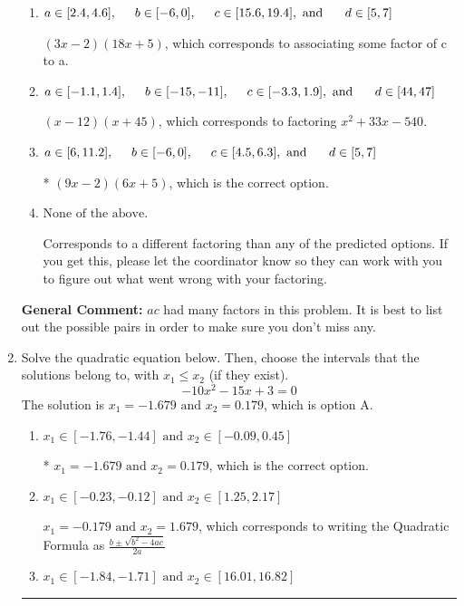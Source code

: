 \documentclass{extbook}[14pt]
\newcommand{\litem}[1]{\item #1

\rule{\textwidth}{0.4pt}}
\begin{document}
\begin{enumerate}
{\begin{enumerate}[label=\Alph*.]
 $(18x -2)(3x + 5)$, which corresponds to associating some factor of a to c.
\item \( a \in [2.4, 4.6], \hspace*{5mm} b \in [-6, 0], \hspace*{5mm} c \in [15.6, 19.4], \text{ and } \hspace*{5mm} d \in [5, 7] \)

 $(3x -2)(18x + 5)$, which corresponds to associating some factor of c to a.
\item \( a \in [-1.1, 1.4], \hspace*{5mm} b \in [-15, -11], \hspace*{5mm} c \in [-3.3, 1.9], \text{ and } \hspace*{5mm} d \in [44, 47] \)

 $(x -12)(x + 45)$, which corresponds to factoring $x^{2} +33 x -540$.
\item \( a \in [6, 11.2], \hspace*{5mm} b \in [-6, 0], \hspace*{5mm} c \in [4.5, 6.3], \text{ and } \hspace*{5mm} d \in [5, 7] \)

* $(9x -2)(6x + 5)$, which is the correct option.
\item \( \text{None of the above.} \)

 Corresponds to a different factoring than any of the predicted options. If you get this, please let the coordinator know so they can work with you to figure out what went wrong with your factoring.
\end{enumerate}

\textbf{General Comment:} $ac$ had many factors in this problem. It is best to list out the possible pairs in order to make sure you don't miss any.
}
\litem{
Solve the quadratic equation below. Then, choose the intervals that the solutions belong to, with $x_1 \leq x_2$ (if they exist).
\[ -10x^{2} -15 x + 3 = 0 \]
The solution is \( x_1 = -1.679 \text{ and } x_2 = 0.179 \), which is option A.\begin{enumerate}[label=\Alph*.]
\item \( x_1 \in [-1.76, -1.44] \text{ and } x_2 \in [-0.09, 0.45] \)

* $x_1 = -1.679 \text{ and } x_2 = 0.179$, which is the correct option.
\item \( x_1 \in [-0.23, -0.12] \text{ and } x_2 \in [1.25, 2.17] \)

 $x_1 = -0.179 \text{ and } x_2 = 1.679$, which corresponds to writing the Quadratic Formula as $\frac{b \pm \sqrt{b^2 - 4ac}}{2a}$
\item \( x_1 \in [-1.84, -1.71] \text{ and } x_2 \in [16.01, 16.82] \)


\end{enumerate}}
\end{enumerate}
\end{document}
